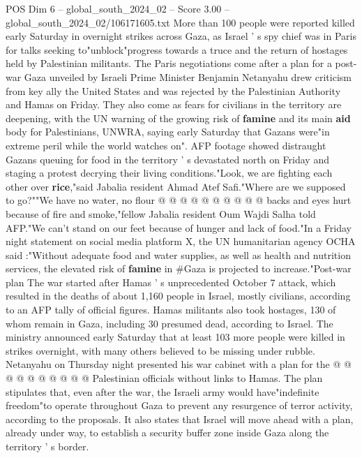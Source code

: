 \begin{textsample}{POS Dim 6 – global\_south\_2024\_02 – Score 3.00 – global\_south\_2024\_02/106171605.txt}  \label{ex:f6_pos_168}
More than 100 people were reported killed early Saturday in overnight strikes across Gaza, as Israel ' s spy chief was in Paris for talks seeking to"unblock"progress towards a truce and the return of hostages held by Palestinian militants.
The Paris negotiations come after a plan for a post-war Gaza unveiled by Israeli Prime Minister Benjamin Netanyahu drew criticism from key ally the United States and was rejected by the Palestinian Authority and Hamas on Friday.
They also come as fears for civilians in the territory are deepening, with the UN warning of the growing risk of \textbf{famine} and its main \textbf{aid} body for Palestinians, UNWRA, saying early Saturday that Gazans were"in extreme peril while the world watches on".
AFP footage showed distraught Gazans queuing for food in the territory ' s devastated north on Friday and staging a protest decrying their living conditions."Look, we are fighting each other over \textbf{rice},"said Jabalia resident Ahmad Atef Safi."Where are we supposed to go?""We have no water, no flour @ @ @ @ @ @ @ @ @ @ backs and eyes hurt because of fire and smoke,"fellow Jabalia resident Oum Wajdi Salha told AFP."We can't stand on our feet because of hunger and lack of food."In a Friday night statement on social media platform X, the UN humanitarian agency OCHA said :"Without adequate food and water supplies, as well as health and nutrition services, the elevated risk of \textbf{famine} in \#Gaza is projected to increase."Post-war plan The war started after Hamas ' s unprecedented October 7 attack, which resulted in the deaths of about 1,160 people in Israel, mostly civilians, according to an AFP tally of official figures.
Hamas militants also took hostages, 130 of whom remain in Gaza, including 30 presumed dead, according to Israel.
The ministry announced early Saturday that at least 103 more people were killed in strikes overnight, with many others believed to be missing under rubble.
Netanyahu on Thursday night presented his war cabinet with a plan for the @ @ @ @ @ @ @ @ @ @ Palestinian officials without links to Hamas.
The plan stipulates that, even after the war, the Israeli army would have"indefinite freedom"to operate throughout Gaza to prevent any resurgence of terror activity, according to the proposals.
It also states that Israel will move ahead with a plan, already under way, to establish a security buffer zone inside Gaza along the territory ' s border.

\end{textsample}
